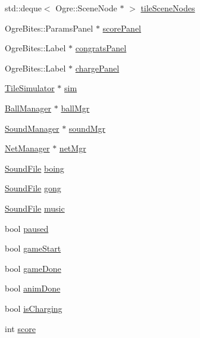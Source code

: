 \begin{DoxyCompactItemize}
std\-::deque$<$ Ogre\-::\-Scene\-Node $\ast$ $>$ \hyperlink{classTileGame_ac8b228c7849cb924a099f94de266c42d}{tile\-Scene\-Nodes}
\item 
Ogre\-Bites\-::\-Params\-Panel $\ast$ \hyperlink{classTileGame_a9a4d1b4dfacca55fdeacf454af04fa0c}{score\-Panel}
\item 
Ogre\-Bites\-::\-Label $\ast$ \hyperlink{classTileGame_a5e8deb9eb2903e1787a28699a9e6f346}{congrats\-Panel}
\item 
Ogre\-Bites\-::\-Label $\ast$ \hyperlink{classTileGame_a2f71619fb4d354c89fd37d460c0b1971}{charge\-Panel}
\item 
\hyperlink{classTileSimulator}{Tile\-Simulator} $\ast$ \hyperlink{classTileGame_a2225cb84303358e59c6093b8a999e085}{sim}
\item 
\hyperlink{classBallManager}{Ball\-Manager} $\ast$ \hyperlink{classTileGame_a7fe1ce6963e7ac2bd5022e653368c0ed}{ball\-Mgr}
\item 
\hyperlink{classSoundManager}{Sound\-Manager} $\ast$ \hyperlink{classTileGame_aca4c76a09f77a7f55ae0c4396f72aefc}{sound\-Mgr}
\item 
\hyperlink{classNetManager}{Net\-Manager} $\ast$ \hyperlink{classTileGame_a691f85c8b3c30335e6b8f6f83a8910ad}{net\-Mgr}
\item 
\hyperlink{SoundManager_8h_a05cf79926d9921eb07e70e460b021307}{Sound\-File} \hyperlink{classTileGame_a796c40847db5cd687417574064fbd90d}{boing}
\item 
\hyperlink{SoundManager_8h_a05cf79926d9921eb07e70e460b021307}{Sound\-File} \hyperlink{classTileGame_a6912a91d6b7eb2e88033d8571e3daecb}{gong}
\item 
\hyperlink{SoundManager_8h_a05cf79926d9921eb07e70e460b021307}{Sound\-File} \hyperlink{classTileGame_a6622c980107331b95697d74839dde768}{music}
\item 
bool \hyperlink{classTileGame_ac76eb85a5597f84146e49c92f7edc877}{paused}
\item 
bool \hyperlink{classTileGame_a276db8a3e88eea0914e6f6262791ee89}{game\-Start}
\item 
bool \hyperlink{classTileGame_a8fb8cd476fcf067cdfe0495fbf9f417e}{game\-Done}
\item 
bool \hyperlink{classTileGame_abdd2197b16e59e2035984882aaebf9e3}{anim\-Done}
\item 
bool \hyperlink{classTileGame_ac1c6b430452c30f0c546ac15918b765f}{is\-Charging}
\item 
int \hyperlink{classTileGame_abba0100f7c52d2a9ae1bfa0f5bbee4a5}{score}
\item 

\end{DoxyCompactItemize}
